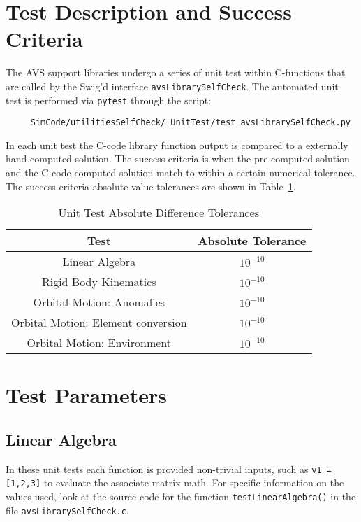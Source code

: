 
\section{Test Description and Success Criteria}
The AVS support libraries undergo a series of unit test within C-functions that are called by the Swig'd interface {\tt avsLibrarySelfCheck}.  The automated unit test is performed via {\tt pytest} through the script:
\begin{verbatim}
     SimCode/utilitiesSelfCheck/_UnitTest/test_avsLibrarySelfCheck.py
\end{verbatim}
In each unit test the C-code library function output is compared to a externally hand-computed solution.  The success criteria is when the pre-computed solution and the C-code computed solution match to within a certain numerical tolerance.  The success criteria absolute value tolerances are shown in Table~\ref{tbl:tolerance}.



\begin{table}[htbp]
	\caption{Unit Test Absolute Difference Tolerances}
	\label{tbl:tolerance}
	\centering \fontsize{10}{10}\selectfont
	\begin{tabular}{c | c} %
		\hline 
		\hline 
		Test    & Absolute Tolerance \\
		\hline 
		  Linear Algebra    & $10^{-10}$ \\
		  Rigid Body Kinematics    & $10^{-10}$ \\
		  Orbital Motion: Anomalies    & $10^{-10}$ \\
		  Orbital Motion: Element conversion    & $10^{-10}$ \\
		  Orbital Motion: Environment    & $10^{-10}$ \\
		\hline
		\hline
	\end{tabular}
\end{table}





\section{Test Parameters}

\subsection{Linear Algebra}
In these unit tests each function is provided non-trivial inputs, such as {\tt v1 = [1,2,3]} to evaluate the associate matrix math.  For specific information on the values used, look at the source code for the function {\tt testLinearAlgebra()} in the file {\tt avsLibrarySelfCheck.c}.  

